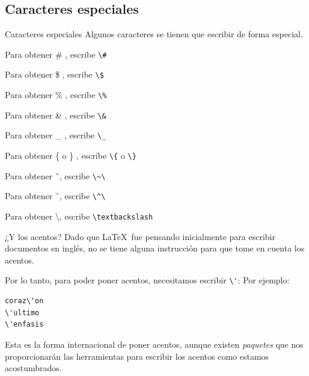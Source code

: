 \documentclass[11pt]{beamer}
\begin{document}
	\subsection{Caracteres especiales}
		\begin{frame}[containsverbatim]{Caracteres especiales}
			Algunos caracteres se tienen que escribir de forma especial.
			
			Para obtener \# , escribe \lstinline!\#!
			
			Para obtener \$ , escribe \lstinline!\$!
			
			Para obtener \% , escribe \lstinline!\%!
			
			Para obtener \& , escribe \lstinline!\&!
			
			Para obtener \_ , escribe \lstinline!\_!
			
			Para obtener \{ o \} , escribe \lstinline!\{! o \lstinline!\}!
			
			Para obtener \~\ , escribe \lstinline!\~\!
			
			Para obtener \^\ , escribe \lstinline!\^\!
			
			Para obtener \textbackslash , escribe \lstinline!\textbackslash!
			
\end{frame}
			\begin{frame}[containsverbatim]{¿Y los acentos?}
				Dado que \LaTeX\ fue pensando inicialmente para escribir documentos 
				en inglés, no se tiene alguna instrucción para que tome en cuenta los acentos.

				Por lo tanto, para poder poner acentos, necesitamos escribir \lstinline!\'!:
				Por ejemplo:
				\begin{lstlisting}
coraz\'on
\'ultimo
\'enfasis
				\end{lstlisting}
				
				Esta es la forma internacional de poner acentos, aunque existen
				\emph{paquetes} que nos proporcionarán las herramientas para 
				escribir los acentos como estamos acostumbrados.
	\end{frame}
\end{document}
